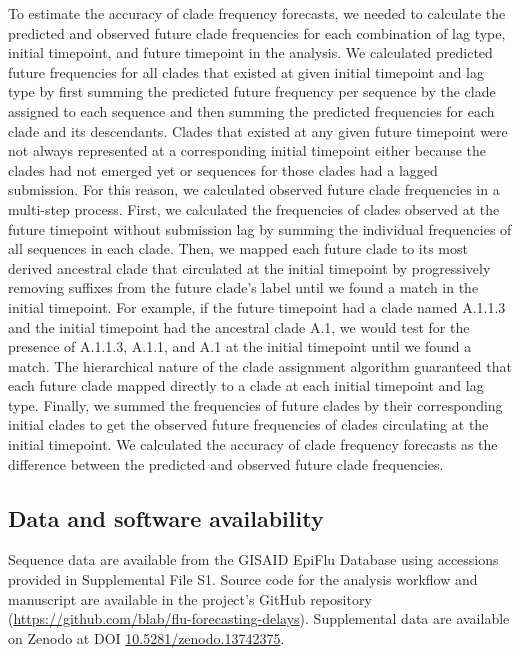 \documentclass[9pt,lineno]{elife}
\begin{document}
To estimate the accuracy of clade frequency forecasts, we needed to calculate the predicted and observed future clade frequencies for each combination of lag type, initial timepoint, and future timepoint in the analysis.
We calculated predicted future frequencies for all clades that existed at given initial timepoint and lag type by first summing the predicted future frequency per sequence by the clade assigned to each sequence and then summing the predicted frequencies for each clade and its descendants.
Clades that existed at any given future timepoint were not always represented at a corresponding initial timepoint either because the clades had not emerged yet or sequences for those clades had a lagged submission.
For this reason, we calculated observed future clade frequencies in a multi-step process.
First, we calculated the frequencies of clades observed at the future timepoint without submission lag by summing the individual frequencies of all sequences in each clade.
Then, we mapped each future clade to its most derived ancestral clade that circulated at the initial timepoint by progressively removing suffixes from the future clade's label until we found a match in the initial timepoint.
For example, if the future timepoint had a clade named A.1.1.3 and the initial timepoint had the ancestral clade A.1, we would test for the presence of A.1.1.3, A.1.1, and A.1 at the initial timepoint until we found a match.
The hierarchical nature of the clade assignment algorithm guaranteed that each future clade mapped directly to a clade at each initial timepoint and lag type.
Finally, we summed the frequencies of future clades by their corresponding initial clades to get the observed future frequencies of clades circulating at the initial timepoint.
We calculated the accuracy of clade frequency forecasts as the difference between the predicted and observed future clade frequencies.

\subsection*{Data and software availability}

Sequence data are available from the GISAID EpiFlu Database using accessions provided in Supplemental File S1.
Source code for the analysis workflow and manuscript are available in the project's GitHub repository (\url{https://github.com/blab/flu-forecasting-delays}).
Supplemental data are available on Zenodo at DOI \href{https://zenodo.org/records/13742375}{10.5281/zenodo.13742375}.
\end{document}
